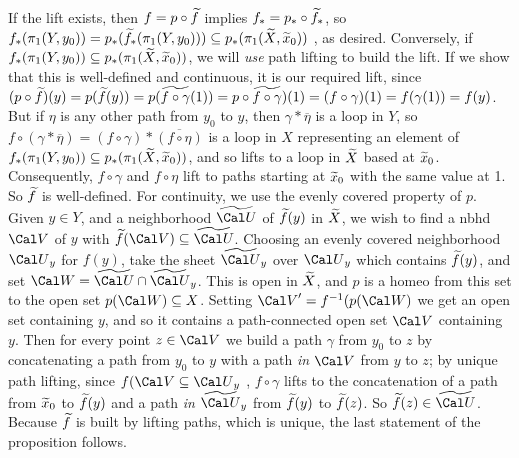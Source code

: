 If the lift exists, then $f=p\circ\widetilde{f}$ implies 
$f_*=p_*\circ\widetilde{f}_*$, so 
$f_*(\pi_1(Y,y_0)) = p_*(\widetilde{f}_*(\pi_1(Y,y_0)))\subseteq p_*(\pi_1(\widetilde{X},\widetilde{x}_0))$ , as desired.
Conversely, if $f_*(\pi_1(Y,y_0))\subseteq p_*(\pi_1(\widetilde{X},\widetilde{x}_0))$,
 we will {\it use} path lifting to build the lift.  If we show that
this is well-defined and continuous, it is our required lift, 
since $(p\circ\widetilde{f})(y) = p(\widetilde{f}(y))=p(\widetilde{f\circ\gamma}(1))
=p\circ\widetilde{f\circ\gamma})(1) = (f\circ\gamma)(1) = f(\gamma(1)) = f(y)$. 
But if $\eta$ is any other path from 
$y_0$ to $y$, then $\gamma*\overline{\eta}$ is a loop in $Y$, 
so $f\circ(\gamma*\overline{\eta})=(f\circ\gamma)*\overline{(f\circ\eta)}$
is a loop in $X$ representing an element of 
$f_*(\pi_1(Y,y_0))\subseteq p_*(\pi_1(\widetilde{X},\widetilde{x}_0))$, and
so lifts to a loop in $\widetilde{X}$ based at $\widetilde{x}_0$.
Consequently, $f\circ\gamma$ and $f\circ\eta$ lift to paths
starting at $\widetilde{x}_0$ with the same value at 1. So $\widetilde{f}$ is
well-defined. For continuity, we use the 
evenly covered property of $p$. Given $y\in Y$,
and  a neighborhood $\wtl{\Cal U}$ of 
$\widetilde{f}(y)$ in $\widetilde{X}$, 
we wish to find a nbhd ${\Cal V}$ of $y$ with 
$\wtl{f}({\Cal V})\sset\wtl{\Cal U}$. Choosing an evenly covered 
neighborhood ${\Cal U}_y$ for $f(y)$, take the sheet 
$\wtl{\Cal U}_y$ over ${\Cal U}_y$ which contains $\widetilde{f}(y)$,
and set ${\Cal W}=\wtl{\Cal U}\cap \wtl{\Cal U}_y$. This is open in 
$\widetilde{X}$, and $p$ is a homeo from this 
set to the open set $p({\Cal W})\sset X$. Setting ${\Cal V}^\prime= f\inv(p({\Cal W})$
we get an open set containing $y$, and so it contains a path-connected open 
set ${\Cal V}$ containing $y$. Then for every point $z\in {\Cal V}$ we build a path
$\gamma$
from $y_0$ to $z$ by concatenating a path from $y_0$ to $y$ with a path {\it in} ${\Cal V}$
from $y$ to $z$; by unique path lifting, 
since $f({\Cal V}\sset {\Cal U}_y$ , $f\circ\gamma$ lifts to 
the concatenation of a path from $\widetilde{x}_0$ to $\widetilde{f}(y)$ and a 
path {\it in} $\wtl{\Cal U}_y$ from $\widetilde{f}(y)$ to $\widetilde{f}(z)$.
So $\wtl{f}(z)\in\wtl{\Cal U}$.
Because $\widetilde{f}$ is built by lifting paths, which is unique, 
the last statement of the proposition follows.

\msk

